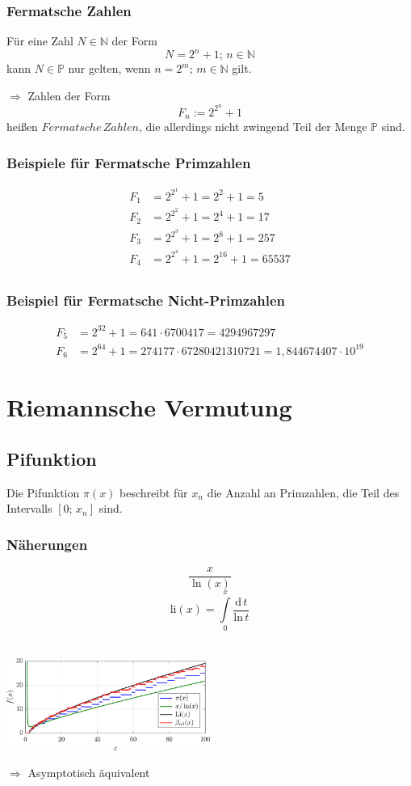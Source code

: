 \documentclass{article}
\newcommand{\PR}{\mathbb{P}}
\newcommand{\N}{\mathbb{N}}
\begin{document}
\subsubsection{Fermatsche Zahlen}

Für eine Zahl $N \in \N$ der Form
\[ N = 2^n + 1;\, n \in \N \]
kann $N \in \PR$ nur gelten, wenn $n = 2^m;\, m \in \N$ gilt.

$\Longrightarrow$ Zahlen der Form
\[ F_n := 2^{2^n} + 1\]
heißen $Fermatsche\,Zahlen$, die allerdings nicht zwingend Teil der Menge $\PR$ sind.

\subsubsection{Beispiele für Fermatsche Primzahlen}

\begin{align*}
F_1 &= 2^{2^1} + 1 = 2^{2} + 1 = 5		\\
F_2 &= 2^{2^2} + 1 = 2^{4} + 1 = 17		\\
F_3 &= 2^{2^3} + 1 = 2^{8} + 1 = 257	\\
F_4 &= 2^{2^4} + 1 = 2^{16} + 1 = 65537	\\
\end{align*}

\subsubsection{Beispiel für Fermatsche Nicht-Primzahlen}
\begin{align*}
F_5 &= 2^{32} + 1 = 641 \cdot 6700417 = 4294967297 \\
F_6 &= 2^{64} + 1 =  274177 \cdot 67280421310721 = 1,844674407 \cdot 10^{19}
\end{align*}

\section{Riemannsche Vermutung}

\subsection{Pifunktion}
Die Pifunktion $\pi(x)$ beschreibt für $x_n$ die Anzahl an Primzahlen, die Teil des Intervalls $[0;\,x_n]$ sind.

\subsubsection{Näherungen}
\[ \frac{x}{\ln(x)} \]
\[ \textrm{li}(x) = \int\limits_{0}^{x} \frac{\textrm{d}\,t}{\textrm{ln}\,t} \]
\\
\begin{center}
\includegraphics[width=0.5\textwidth]{prime-counting.png}
\end{center}
$\Longrightarrow$ Asymptotisch äquivalent
\end{document}
